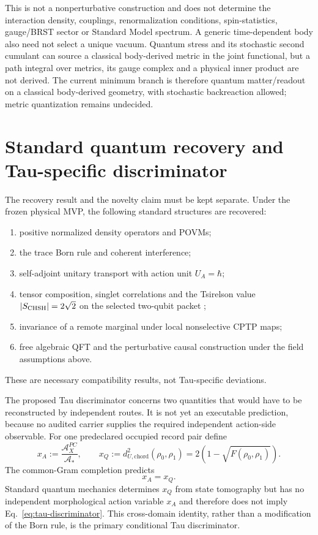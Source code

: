 \documentclass[11pt]{article}
\begin{document}
This is not a nonperturbative construction and does not determine the
interaction density, couplings, renormalization conditions, spin-statistics,
gauge/BRST sector or Standard Model spectrum.  A generic time-dependent body
also need not select a unique vacuum.  Quantum stress and its stochastic
second cumulant can source a classical body-derived metric in the joint
functional, but a path integral over metrics, its gauge complex and a physical
inner product are not derived.  The current minimum branch is therefore
quantum matter/readout on a classical body-derived geometry, with stochastic
backreaction allowed; metric quantization remains undecided.

\section{Standard quantum recovery and Tau-specific discriminator}

The recovery result and the novelty claim must be kept separate.  Under the
frozen physical MVP, the following standard structures are recovered:
\begin{enumerate}[label=(R\arabic*)]
\item positive normalized density operators and POVMs;
\item the trace Born rule and coherent interference;
\item self-adjoint unitary transport with action unit $U_A=\hbar$;
\item tensor composition, singlet correlations and the Tsirelson value
$|S_{\rm CHSH}|=2\sqrt2$ on the selected two-qubit packet
\citep{Tsirelson1980};
\item invariance of a remote marginal under local nonselective CPTP maps;
\item free algebraic QFT and the perturbative causal construction under the
field assumptions above.
\end{enumerate}
These are necessary compatibility results, not Tau-specific deviations.

The proposed Tau discriminator concerns two quantities that would have to be
reconstructed by independent routes.  It is not yet an executable prediction,
because no audited carrier supplies the required independent action-side
observable.  For one predeclared occupied record pair define
\begin{equation}
 x_A:=\frac{\mathcal A_X^{PC}}{\mathcal A_*},
 \qquad
 x_Q:=d_{U,\mathrm{chord}}^2(\rho_0,\rho_1)
 =2\left(1-\sqrt{F(\rho_0,\rho_1)}\right).
 \label{eq:tau-action-uhlmann}
\end{equation}
The common-Gram completion predicts
\begin{equation}
 \boxed{x_A=x_Q.}
 \label{eq:tau-discriminator}
\end{equation}
Standard quantum mechanics determines $x_Q$ from state tomography but has no
independent morphological action variable $x_A$ and therefore does not imply
Eq.~\eqref{eq:tau-discriminator}.  This cross-domain identity, rather than a
modification of the Born rule, is the primary conditional Tau discriminator.
\end{document}
